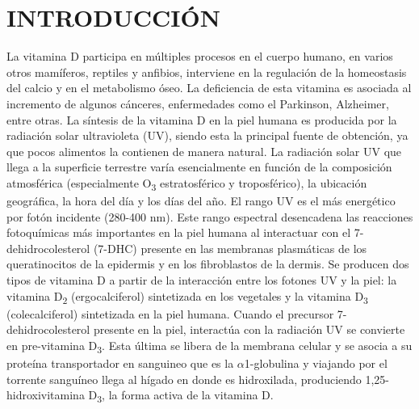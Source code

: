 \documentclass[10pt,twocolumn]{article}
\begin{document}
\section{INTRODUCCIÓN}
La vitamina D participa en múltiples procesos en el cuerpo humano, en varios otros mamíferos, reptiles y anfibios, interviene en la regulación de la homeostasis del calcio y en el metabolismo óseo. La deficiencia de esta vitamina es asociada al incremento de algunos cánceres, enfermedades como el Parkinson, Alzheimer, entre otras.\cite{Zittermann2011,Afzal2013,KRAVIETZ201750} La síntesis de la vitamina D en la piel humana es producida por la radiación solar ultravioleta (UV), siendo esta la principal fuente de obtención, ya que pocos alimentos la contienen de manera natural\cite{Biesalski_2002}. La radiación solar UV que llega a la superficie terrestre varía esencialmente en función de la composición atmosférica (especialmente O\textsubscript{3} estratosférico y troposférico), la ubicación geográfica, la hora del día y los días del año. El rango UV es el más energético por fotón incidente (280-400 nm). Este rango espectral desencadena las reacciones fotoquímicas más importantes en la piel humana al interactuar con el 7-dehidrocolesterol (7-DHC) presente en las membranas plasmáticas de los queratinocitos de la epidermis y en los fibroblastos de la dermis.\cite{2002,brunser_radiacion_2005,Olds2008} Se producen dos tipos de vitamina D a partir de la interacción entre los fotones UV y la piel: la vitamina D\textsubscript{2} (ergocalciferol) sintetizada en los vegetales y la vitamina D\textsubscript{3} (colecalciferol) sintetizada en la piel humana.\cite{Zhang2010} Cuando el precursor 7-dehidrocolesterol presente en la piel, interactúa con la radiación UV se convierte en pre-vitamina D\textsubscript{3}. Esta última se libera de la membrana celular y se asocia a su proteína transportador en sanguineo que es la $\alpha$1-globulina y viajando por el torrente sanguíneo llega al hígado en donde es hidroxilada, produciendo 1,25-hidroxivitamina D\textsubscript{3}, la forma activa de la vitamina D.\cite{brunser_radiacion_2005}
\end{document}
